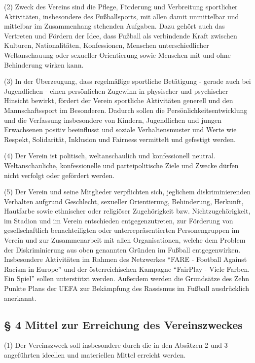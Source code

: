 \documentclass[11pt,a4paper]{article}
\begin{document}
(2)
Zweck des Vereins sind die Pflege, Förderung und Verbreitung sportlicher Aktivitäten, insbesondere des Fußballsports, mit allen damit unmittelbar und mittelbar im Zusammenhang stehenden Aufgaben.
Dazu gehört auch das Vertreten und Fördern der Idee, dass Fußball als verbindende Kraft zwischen Kulturen, Nationalitäten, Konfessionen, Menschen unterschiedlicher Weltanschauung oder sexueller Orientierung sowie Menschen mit und ohne Behinderung wirken kann.

(3)
In der Überzeugung, dass regelmäßige sportliche Betätigung - gerade auch bei Jugendlichen - einen persönlichen Zugewinn in physischer und psychischer Hinsicht bewirkt, fördert der Verein sportliche Aktivitäten generell und den Mannschaftssport im Besonderen.
Dadurch sollen die Persönlichkeitsentwicklung und die Verfassung insbesondere von Kindern, Jugendlichen und jungen Erwachsenen positiv beeinflusst und soziale Verhaltensmuster und Werte wie Respekt, Solidarität, Inklusion und Fairness vermittelt und gefestigt werden.

(4)
Der Verein ist politisch, weltanschaulich und konfessionell neutral.
Weltanschauliche, konfessionelle und parteipolitische Ziele und Zwecke dürfen nicht verfolgt oder gefördert werden.

(5)
Der Verein und seine Mitglieder verpflichten sich, jeglichem diskriminierenden Verhalten aufgrund Geschlecht, sexueller Orientierung, Behinderung, Herkunft, Hautfarbe sowie ethnischer oder religiöser Zugehörigkeit bzw. Nichtzugehörigkeit, im Stadion und im Verein entschieden entgegenzutreten, zur Förderung von gesellschaftlich benachteiligten oder unterrepräsentierten Personengruppen im Verein und zur Zusammenarbeit mit allen Organisationen, welche dem Problem der Diskriminierung aus oben genannten Gründen im Fußball entgegenwirken.
Insbesondere Aktivitäten im Rahmen des Netzwerkes "`FARE - Football Against Racism in Europe"' und der österreichischen Kampagne "`FairPlay - Viele Farben. Ein Spiel"' sollen unterstützt werden.
Außerdem werden die Grundsätze des Zehn Punkte Plans der UEFA zur Bekämpfung des Rassismus im Fußball ausdrücklich anerkannt.

\subsection{§ 4
Mittel zur Erreichung des Vereinszweckes}

(1)
Der Vereinszweck soll insbesondere durch die in den Absätzen 2 und 3 angeführten ideellen und materiellen Mittel erreicht werden.
\end{document}
